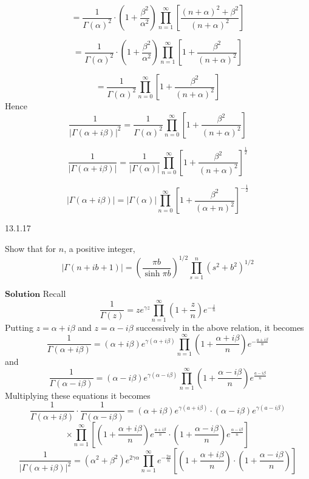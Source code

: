 $$
=\frac{1}{\Gamma(\alpha)^{2}} \cdot\left(1+\frac{\beta^{2}}{\alpha^{2}}\right) \prod_{n=1}^{\infty}\left[\frac{(n+\alpha)^{2}+\beta^{2}}{(n+\alpha)^{2}}\right]
$$

$$
=\frac{1}{\Gamma(\alpha)^{2}} \cdot\left(1+\frac{\beta^{2}}{\alpha^{2}}\right) \prod_{n=1}^{\infty}\left[1+\frac{\beta^{2}}{(n+\alpha)^{2}}\right]
$$

$$
=\frac{1}{\Gamma(\alpha)^{2}} \prod_{n=0}^{\infty}\left[1+\frac{\beta^{2}}{(n+\alpha)^{2}}\right]
$$
Hence
$$
\frac{1}{|\Gamma(\alpha+i \beta)|^{2}}=\frac{1}{\Gamma(\alpha)^{2}} \prod_{n=0}^{\infty}\left[1+\frac{\beta^{2}}{(n+\alpha)^{2}}\right]
$$

$$
\frac{1}{|\Gamma(\alpha+i \beta)|}=\frac{1}{|\Gamma(\alpha)|} \prod_{n=0}^{\infty}\left[1+\frac{\beta^{2}}{(n+\alpha)^{2}}\right]^{\frac{1}{2}}
$$

$$
|\Gamma(\alpha+i \beta)|=|\Gamma(\alpha)| \prod_{n=0}^{\infty}\left[1+\frac{\beta^{2}}{(\alpha+n)^{2}}\right]^{-\frac{1}{2}}
$$



\newpage

\begin{mybox}{13.1.17}

Show that for $n$, a positive integer,
$$
|\Gamma(n+i b+1)|=\left(\frac{\pi b}{\sinh \pi b}\right)^{1 / 2} \prod_{s=1}^{n}\left(s^{2}+b^{2}\right)^{1 / 2}
$$
\end{mybox}

$\boxed{\textbf{Solution}}$ Recall 
$$
\frac{1}{\Gamma(z)}=z e^{\gamma z} \prod_{n=1}^{\infty}\left(1+\frac{z}{n}\right) e^{-\frac{z}{n}}
$$
Putting $z=\alpha+i \beta$ and $z=\alpha-i \beta$ successively in the above relation, it becomes
$$
\frac{1}{\Gamma(\alpha+i \beta)}=(\alpha+i \beta) e^{\gamma(\alpha+i \beta)} \prod_{n=1}^{\infty}\left(1+\frac{\alpha+i \beta}{n}\right) e^{-\frac{a+i \beta}{n}}
$$
and 
$$
\frac{1}{\Gamma(\alpha-i \beta)}=(\alpha-i \beta) e^{\gamma(\alpha-i \beta)} \prod_{n=1}^{\infty}\left(1+\frac{\alpha-i \beta}{n}\right) e^{\frac{a-i \beta}{n}}
$$
Multiplying these equations it becomes
$$
\frac{1}{\Gamma(\alpha+i \beta)} \cdot \frac{1}{\Gamma(\alpha-i \beta)}=(\alpha+i \beta) e^{\gamma(a+i \beta)} \cdot(\alpha-i \beta) e^{\gamma(a-i \beta)}$$
$$\times \prod_{n=1}^{\infty}\left[\left(1+\frac{\alpha+i \beta}{n}\right) e^{\frac{a+i \beta}{n}} \cdot\left(1+\frac{\alpha-i \beta}{n}\right) e^{\frac{\alpha-i \beta}{n}}\right]
$$
$$
\frac{1}{|\Gamma(\alpha+i \beta)|^{2}}=\left(\alpha^{2}+\beta^{2}\right) e^{2\gamma \alpha} \prod_{n=1}^{\infty} e^{-\frac{2 a}{n}}\left[\left(1+\frac{\alpha+i \beta}{n}\right) \cdot\left(1+\frac{\alpha-i \beta}{n}\right)\right]
$$

